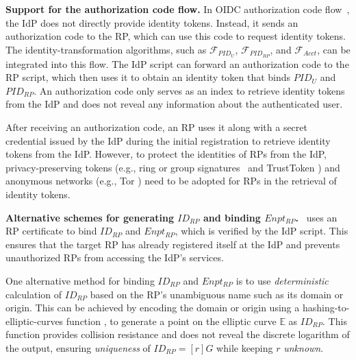 \noindent \textbf{Support for the authorization code flow.} In OIDC authorization code flow~\cite{OpenIDConnect},
 the IdP does not directly provide identity tokens.
 Instead, it sends an authorization code to the RP, which can use this code to request identity tokens.
 The identity-transformation algorithms, such as $\mathcal{F}_{PID_{U}}$, $\mathcal{F}_{PID_{RP}}$, and $\mathcal{F}_{Acct}$,
  can be integrated into this flow. %
The IdP script can forward an authorization code to the RP script,
 which then uses it to obtain an identity token that binds $PID_U$ and $PID_{RP}$.
 An authorization code only serves as an index to retrieve identity tokens from the IdP
  and does not reveal any information about the authenticated user.


After receiving an authorization code,
 an RP uses it along with a secret credential issued by the IdP during the initial registration \cite{OpenIDConnect}
  to retrieve identity tokens from the IdP.
  However, to protect the identities of RPs from the IdP, privacy-preserving tokens
   (e.g., ring or group signatures~\cite{ring-sig,chaum1991group} and TrustToken \cite{trusttoken})
   and anonymous networks (e.g., Tor \cite{tor}) need to be adopted for RPs in the retrieval of identity tokens.

\noindent \textbf{Alternative schemes for generating $ID_{RP}$ and binding $Enpt_{RP}$.} \usso~uses an RP certificate to bind $ID_{RP}$ and $Enpt_{RP}$, which is verified by the IdP script. This ensures that the target RP has already registered itself at the IdP and prevents unauthorized RPs from accessing the IdP's services.

One alternative method for binding $ID_{RP}$ and $Enpt_{RP}$ is
 to use \emph{deterministic} calculation of $ID_{RP}$ based on the RP's unambiguous name such as its domain or origin.
 This can be achieved by encoding the domain or origin using a hashing-to-elliptic-curves function \cite{irtf-cfrg-hash-to-curve-16},
  to generate a point on the elliptic curve $\mathbb{E}$ as $ID_{RP}$.
This function \cite{irtf-cfrg-hash-to-curve-16} provides collision resistance
 and does not reveal the discrete logarithm of the output,
  ensuring \emph{uniqueness} of $ID_{RP} = [r]G$ while keeping $r$ \emph{unknown}. %

